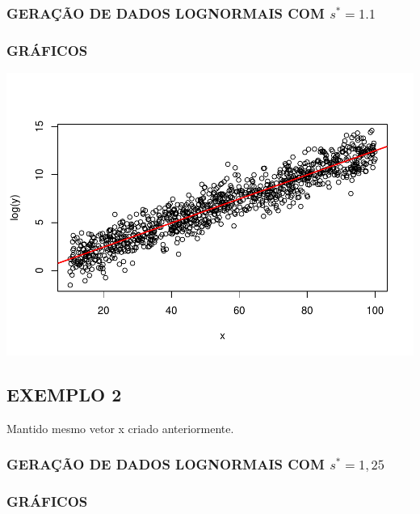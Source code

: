 \documentclass[]{article}
\begin{document}
\subsubsection{\texorpdfstring{GERAÇÃO DE DADOS LOGNORMAIS COM
\(s^* = 1.1\)}{GERAÇÃO DE DADOS LOGNORMAIS COM s\^{}* = 1.1}}\label{geracao-de-dados-lognormais-com-s-1.1}

\subsubsection{GRÁFICOS}\label{graficos}

\includegraphics{Impacto_sigma_files/figure-latex/unnamed-chunk-4-1.pdf}

\subsection{EXEMPLO 2}\label{exemplo-2}

Mantido mesmo vetor x criado anteriormente.

\subsubsection{\texorpdfstring{GERAÇÃO DE DADOS LOGNORMAIS COM
\(s^* = 1,25\)}{GERAÇÃO DE DADOS LOGNORMAIS COM s\^{}* = 1,25}}\label{geracao-de-dados-lognormais-com-s-125}

\subsubsection{GRÁFICOS}\label{graficos-1}
\end{document}
